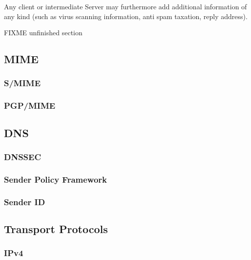 Any client or intermediate Server may furthermore add additional information of any kind (such as virus scanning information, anti spam taxation, reply address).

FIXME unfinished section

\subsection{MIME}
\cite{RFC2045}
\cite{RFC2046}
\cite{RFC2047}
\cite{RFC2048}
\cite{RFC2049}

\subsubsection{S/MIME}
\cite{RFC3851}

\subsubsection{PGP/MIME}
\cite{RFC2440}

\subsection{DNS}
\cite{RFC2929}

\subsubsection{DNSSEC}
\cite{RFC5155}

\subsubsection{Sender Policy Framework}
\cite{RFC4408}
\cite{RFC6652}

\subsubsection{Sender ID}
\cite{RFC4401}

\subsection{Transport Protocols}

\subsubsection{IPv4}
\cite{RFC760}
\cite{RFC791}
\cite{RFC1180}
\cite{RFC792}
\cite{RFC919}
\cite{RFC922}
\cite{RFC950}
\cite[p.~3]{RFC793}

